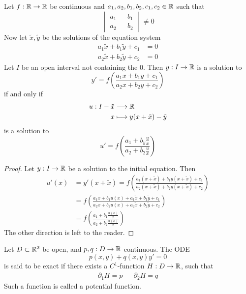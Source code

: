 \documentclass[../../script.tex]{subfiles}
\begin{document}
\begin{eg}
    Let $f: \mathbb{R} \rightarrow \mathbb{R}$ be continuous and $a_1, a_2, b_1, b_2, c_1, c_2 \in \mathbb{R}$ such that 
    \[
        \begin{vmatrix}
            a_1 && b_1 \\
            a_2 && b_2
        \end{vmatrix} \ne 0
    \]
    Now let $\tilde{x}, \tilde{y}$ be the solutions of the equation system 
    \begin{align*}
        a_1\tilde{x} + b_1\tilde{y} + c_1 &= 0 \\
        a_2\tilde{x} + b_2\tilde{y} + c_2 &= 0
    \end{align*}
    Let $I$ be an open interval not containing the $0$. Then $y: I \rightarrow \mathbb{R}$ is a solution to 
    \[
        y' = f\left(\frac{a_1x + b_1y + c_1}{a_2x + b_2y + c_2}\right)
    \]
    if and only if 
    \begin{align*}
        u: I - \tilde{x} &\longrightarrow \mathbb{R} \\
        x &\longmapsto y(x + \tilde{x}) - \tilde{y}
    \end{align*}
    is a solution to 
    \[
        u' = f\left(\frac{a_1 + b_y \frac{u}{x}}{a_2 + b_2 \frac{u}{x}}\right)
    \]
\end{eg}
\begin{proof}
    Let $y: I \rightarrow \mathbb{R}$ be a solution to the initial equation. Then 
    \begin{equation}
        \begin{split}
            u'(x) &= y'(x + \tilde{x}) = f\left( \frac{a_1(x + \tilde{x}) + b_1 y(x + \tilde{x}) + c_1}{a_2(x + \tilde{x}) + b_2y(x + \tilde{x}) + c_2} \right) \\
            &= f\left( \frac{a_1x + b_1u(x) + a_1\tilde{x} + b_1\tilde{y} + c_1}{a_2x + b_2u(x) + a_2\tilde{x} + b_2\tilde{y} + c_2} \right) \\
            &= f\left(\frac{a_1 + b_1 \frac{u(x)}{x}}{a_2 + b_2 \frac{u(x)}{x}}\right)
        \end{split}
    \end{equation}
    The other direction is left to the reader.
\end{proof}

\begin{defi}
    Let $D \subset \mathbb{R}^2$ be open, and $p, q: D \rightarrow \mathbb{R}$ continuous.
    The ODE 
    \[
        p(x, y) + q(x, y) y' = 0
    \]
    is said to be exact if there exists a $C^1$-function $H: D \rightarrow \mathbb{R}$, such that
    \begin{align*}
        \partial_1 H = p && \partial_2 H = q
    \end{align*}
    Such a function is called a potential function.
\end{defi}
\end{document}
